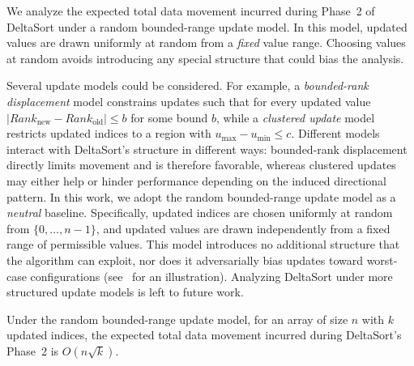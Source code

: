 We analyze the expected total data movement incurred during Phase~2 of DeltaSort under a random bounded-range update model. In this model, updated values are drawn uniformly at random from a \emph{fixed} value range. Choosing values at random avoids introducing any special structure that could bias the analysis.

\begin{remark}
\label{rem:update-model}
Several update models could be considered. For example, a \emph{bounded-rank displacement} model constrains updates such that for every updated value $|Rank_{\text{new}} - Rank_{\text{old}}| \le b$ for some bound $b$, while a \emph{clustered update} model restricts updated indices to a region with $u_{\max} - u_{\min} \le c$. Different models interact with DeltaSort’s structure in different ways: bounded-rank displacement directly limits movement and is therefore favorable, whereas clustered updates may either help or hinder performance depending on the induced directional pattern. In this work, we adopt the random bounded-range update model as a \emph{neutral} baseline. Specifically, updated indices are chosen uniformly at random from $\{0, \ldots, n-1\}$, and updated values are drawn independently from a fixed range of permissible values. This model introduces no additional structure that the algorithm can exploit, nor does it adversarially bias updates toward worst-case configurations (see~ for an illustration). Analyzing DeltaSort under more structured update models is left to future work.
\end{remark}

\begin{lemma}
\label{lem:movement-bound}
Under the random bounded-range update model, for an array of size $n$ with $k$ updated indices, the expected total data movement incurred during DeltaSort's Phase~2 is $O(n \sqrt{k})$.
\end{lemma}

